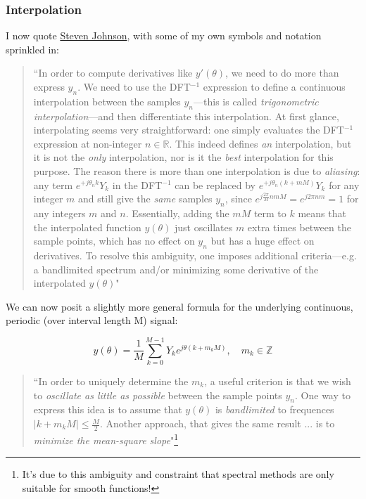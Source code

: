 \documentclass[10pt]{article}
\begin{document}
\subsubsection{Interpolation}

I now quote \href{https://math.mit.edu/~stevenj/fft-deriv.pdf}{Steven Johnson}\cite{johnson}, with some of my own symbols and notation sprinkled in:

\begin{quotation}
``In order to compute derivatives like $y'(\theta)$, we need to do more than express $y_n$. We need to use the DFT$^{-1}$ expression to define a continuous interpolation between the samples $y_n$---this is called \textit{trigonometric interpolation}---and then differentiate this interpolation. At first glance, interpolating seems very straightforward: one simply evaluates the DFT$^{-1}$ expression at non-integer $n \in \mathbb{R}$. This indeed defines \textit{an} interpolation, but it is not the \textit{only} interpolation, nor is it the \textit{best} interpolation for this purpose. The reason there is more than one interpolation is due to \textit{aliasing}: any term $e^{+j \theta_n k} Y_k$ in the DFT$^{-1}$ can be replaced by $e^{+j \theta_n (k + mM)} Y_k$ for any integer $m$ and still give the \textit{same} samples $y_n$, since $e^{j \frac{2\pi}{M} nmM} = e^{j2\pi nm} = 1$ for any integers $m$ and $n$. Essentially, adding the $mM$ term to $k$ means that the interpolated function $y(\theta)$ just oscillates $m$ extra times between the sample points, which has no effect on $y_n$ but has a huge effect on derivatives. To resolve this ambiguity, one imposes additional criteria---e.g. a bandlimited spectrum and/or minimizing some derivative of the interpolated $y(\theta)$"
\end{quotation}

We can now posit a slightly more general formula for the underlying continuous, periodic (over interval length M) signal:

$$ y(\theta) = \frac{1}{M} \sum_{k=0}^{M-1} Y_k e^{j \theta (k + m_k M)}, \quad m_k \in \mathbb{Z} $$

\begin{quotation}
``In order to uniquely determine the $m_k$, a useful criterion is that we wish to \textit{oscillate as little as possible} between the sample points $y_n$. One way to express this idea is to assume that $y(\theta)$ is \textit{bandlimited} to frequences $|k + m_k M| \leq \frac{M}{2}$. Another approach, that gives the same result ... is to \textit{minimize the mean-square slope}"\footnote{It's due to this ambiguity and constraint that spectral methods are only suitable for smooth functions!}
\end{quotation}
\end{document}
